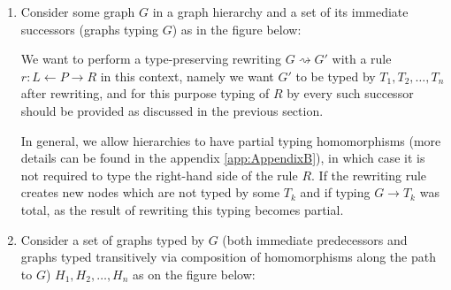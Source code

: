 \begin{enumerate}
    

\item Consider some graph $G$ in a graph hierarchy and a set of its immediate successors (graphs typing $G$) as in the figure below:

\begin{center}
\end{center}

We want to perform a type-preserving rewriting $G \rightsquigarrow G'$ with a rule $r: L \leftarrow P \rightarrow R$ in this context, namely we want $G'$ to be typed by $T_1, T_2, \ldots, T_n$ after rewriting, and for this purpose typing of $R$ by every such successor should be provided as discussed in the previous section. 

\begin{remark}
    In general, we allow hierarchies to have partial typing homomorphisms (more details can be found in the appendix \ref{app:AppendixB}), in which case it is not required to type the right-hand side of the rule $R$. If the rewriting rule creates new nodes which are not typed by some $T_k$ and if typing $G \rightarrow T_k$ was total, as the result of  rewriting this typing becomes partial.
\end{remark}

\item Consider a set of graphs typed by $G$ (both immediate predecessors and graphs typed transitively via composition of homomorphisms along the path to $G$) $H_1, H_2, \ldots, H_n$ as on the figure below:

\begin{center}
\end{center}


\end{enumerate}
